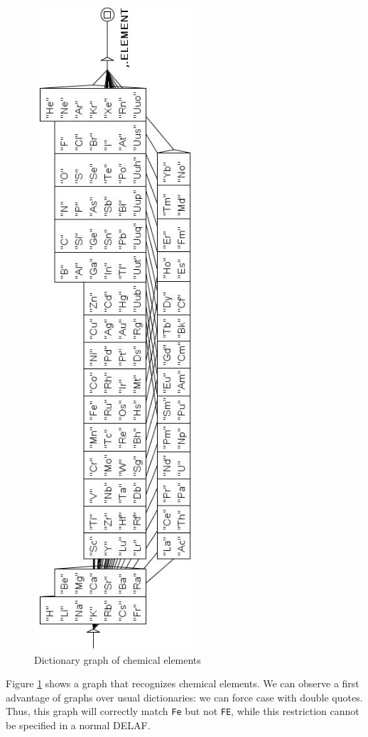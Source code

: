 \begin{figure}[!p]
\begin{center}
\includegraphics[height=24cm]{resources/img/fig3-12.png}
\caption{Dictionary graph of chemical elements\label{elements}}
\end{center}
\end{figure}

\bigskip
\noindent Figure \ref{elements} shows a graph that recognizes chemical
elements. We can observe a first advantage of graphs over usual dictionaries: we can force case
with double quotes. Thus, this graph will
correctly match \verb+Fe+ but not \verb+FE+, while this restriction cannot be specified in a
normal DELAF.

